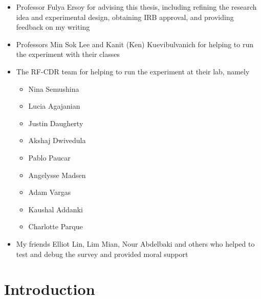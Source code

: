 \documentclass[
  12,
  letterpaper,
  DIV=11,
  numbers=noendperiod]{scrartcl}
\providecommand{\tightlist}{%
  \setlength{\itemsep}{0pt}\setlength{\parskip}{0pt}}\usepackage{longtable,booktabs,array}
\begin{document}
\begin{itemize}
\tightlist
\item
  Professor Fulya Ersoy for advising this thesis, including refining the
  research idea and experimental design, obtaining IRB approval, and
  providing feedback on my writing
\item
  Professors Min Sok Lee and Kanit (Ken) Kuevibulvanich for helping to
  run the experiment with their classes
\item
  The RF-CDR team for helping to run the experiment at their lab, namely

  \begin{itemize}
  \tightlist
  \item
    Nina Semushina
  \item
    Lucia Agajanian
  \item
    Justin Daugherty
  \item
    Akshaj Dwivedula
  \item
    Pablo Paucar
  \item
    Angelysse Madsen
  \item
    Adam Vargas
  \item
    Kaushal Addanki
  \item
    Charlotte Parque
  \end{itemize}
\item
  My friends Elliot Lin, Lim Mian, Nour Abdelbaki and others who helped
  to test and debug the survey and provided moral support
\end{itemize}

\newpage

\section{Introduction}\label{introduction}
\end{document}
